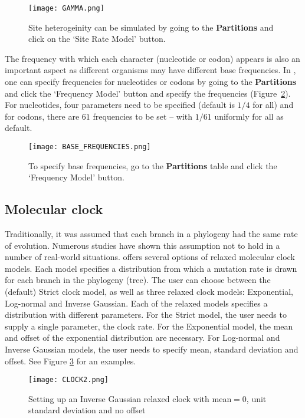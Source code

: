 \begin{figure}[H]
\centering
\texttt{[image: GAMMA.png]} 
\caption{Site heterogeinity can be simulated by going to the \textbf{Partitions} and click on the `Site Rate Model' button.}
\label{fig:gamma}
\end{figure}

The frequency with which each character (nucleotide or codon) appears is also an important aspect as different organisms may have different base frequencies. 
In {\bussname}, one can specify frequencies for nucleotides or codons by going to the \textbf{Partitions} and click the `Frequency Model' button and specify the frequencies (Figure~\ref{fig:bases}). For nucleotides, four parameters need to be specified (default is $1/4$ for all) and for codons, there are $61$ frequencies to be set -- with $1/61$ uniformly for all as default.

\begin{figure}[H]
\centering
\texttt{[image: BASE\_FREQUENCIES.png]} 
\caption{To specify base frequencies, go to the \textbf{Partitions} table and click the `Frequency Model' button.}
\label{fig:bases}
\end{figure}

\subsection{Molecular clock}

Traditionally, it was assumed that each branch in a phylogeny had the same rate of evolution. 
Numerous studies have shown this assumption not to hold in a number of real-world situations. 
{\bussname} offers several options of relaxed molecular clock models. 
Each model specifies a distribution from which a mutation rate is drawn for each branch in the phylogeny (tree). 
The user can choose between the (default) Strict clock model, as well as three relaxed clock models: Exponential, Log-normal and Inverse Gaussian. 
Each of the relaxed models specifies a distribution with different parameters. 
For the Strict model, the user needs to supply a single parameter, the clock rate. 
For the Exponential model, the mean and offset of the exponential distribution are necessary. 
For Log-normal and Inverse Gaussian models, the user needs to specify mean, standard deviation and offset. 
See Figure \ref{fig:clock2} for an examples.  

\begin{figure}[H]
\centering
\texttt{[image: CLOCK2.png]} 
\caption{ Setting up an Inverse Gaussian relaxed clock with mean$=0$, unit standard deviation and no offset}
\label{fig:clock2}
\end{figure}

